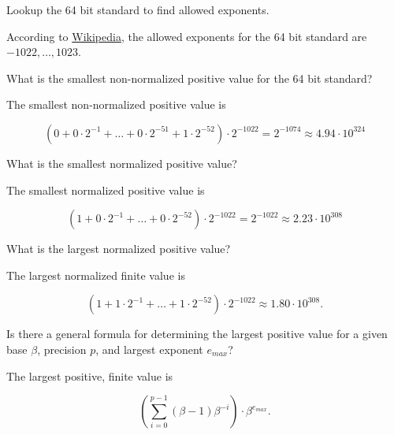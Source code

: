 \documentclass[]{book}
\theoremstyle{definition}
\theoremstyle{definition}
\theoremstyle{definition}
\theoremstyle{remark}
\let\BeginKnitrBlock\begin \let\EndKnitrBlock\end
\begin{document}
\BeginKnitrBlock{exercise}
\protect\hypertarget{exr:q201}{}{\label{exr:q201} }Lookup the 64 bit
standard to find allowed exponents.
\EndKnitrBlock{exercise}

\BeginKnitrBlock{solution}
\iffalse{} {Solution. } \fi{}According to
\href{https://en.wikipedia.org/wiki/Double-precision_floating-point_format}{Wikipedia},
the allowed exponents for the 64 bit standard are
\(-1022,\ldots, 1023\).
\EndKnitrBlock{solution}

\BeginKnitrBlock{exercise}
\protect\hypertarget{exr:q202}{}{\label{exr:q202} }What is the smallest
non-normalized positive value for the 64 bit standard?
\EndKnitrBlock{exercise}

\BeginKnitrBlock{solution}
\iffalse{} {Solution. } \fi{}The smallest non-normalized positive value
is

\[
  \left(0 + 0\cdot 2^{-1} + \ldots + 0\cdot 2^{-51} + 1\cdot 2^{-52} \right )\cdot 2^{-1022} = 2^{-1074} \approx 4.94\cdot 10^{324}
\]
\EndKnitrBlock{solution}

\BeginKnitrBlock{exercise}
\protect\hypertarget{exr:q203}{}{\label{exr:q203} }What is the smallest
normalized positive value?
\EndKnitrBlock{exercise}

\BeginKnitrBlock{solution}
\iffalse{} {Solution. } \fi{}The smallest normalized positive value is

\[
  \left(1 + 0\cdot 2^{-1} + \ldots + 0\cdot 2^{-52} \right )\cdot 2^{-1022} = 2^{-1022} \approx 2.23 \cdot 10^{308}
\]
\EndKnitrBlock{solution}

\BeginKnitrBlock{exercise}
\protect\hypertarget{exr:q204}{}{\label{exr:q204} }What is the largest
normalized positive value?
\EndKnitrBlock{exercise}

\BeginKnitrBlock{solution}
\iffalse{} {Solution. } \fi{}The largest normalized finite value is

\[
  \left(1 + 1\cdot 2^{-1} + \ldots + 1\cdot 2^{-52} \right )\cdot 2^{-1022} \approx 1.80\cdot 10^{308}.
\]
\EndKnitrBlock{solution}

\BeginKnitrBlock{exercise}
\protect\hypertarget{exr:q205}{}{\label{exr:q205} }Is there a general
formula for determining the largest positive value for a given base
\(\beta\), precision \(p\), and largest exponent \(e_{max}\)?
\EndKnitrBlock{exercise}

\BeginKnitrBlock{solution}
\iffalse{} {Solution. } \fi{}The largest positive, finite value is

\[
  \left(\sum_{i=0}^{p-1} (\beta-1)\beta^{-i}\right)\cdot \beta^{e_{max}}.
\]
\EndKnitrBlock{solution}
\end{document}
